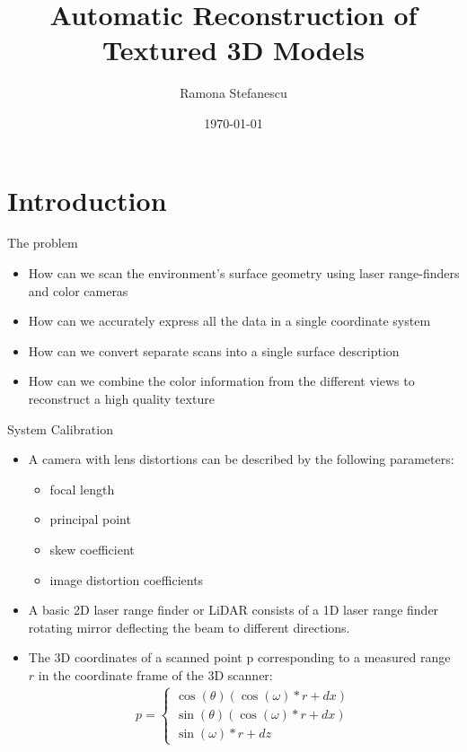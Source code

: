 \documentclass[10pt,mathserif]{beamer}
\title{\large \bfseries Automatic Reconstruction of Textured 3D Models}
\author{Ramona Stefanescu\\[3ex]
}
\date{\today}
\begin{document}
\frame{
\thispagestyle{empty}
\titlepage
}

\section{Introduction}

\begin{frame}{The problem}
\begin{itemize}
\item How can we scan the environment's surface geometry using laser range-finders and color cameras
\item How can we accurately express all the data in a single coordinate system
\item How can we convert separate scans into a single surface description
\item How can we combine the color information from the different views to reconstruct a high quality texture
\end{itemize}
\end{frame}

\begin{frame}{System Calibration}
\begin{itemize}
\item A camera with lens distortions can be described by the following parameters:
\begin{itemize}
\item focal length
\item principal point
\item skew coefficient 
\item image distortion coefficients
\end{itemize}
\item A basic 2D laser range finder or LiDAR consists of a 1D laser range finder rotating mirror
deflecting the beam to different directions.
\item The 3D coordinates of a scanned point p corresponding to a measured range $r$ in the coordinate
frame of the 3D scanner:
\begin{align}
p = 
\left\{
	\begin{array}{ll}
		 \cos(\theta)(\cos(\omega)*r + dx) \\
                 \sin(\theta)(\cos(\omega)*r + dx) \\
	         \sin(\omega)*r + dz
         \end{array}
\right.
\end{align}
\end{itemize}
\end{frame}
\end{document}
